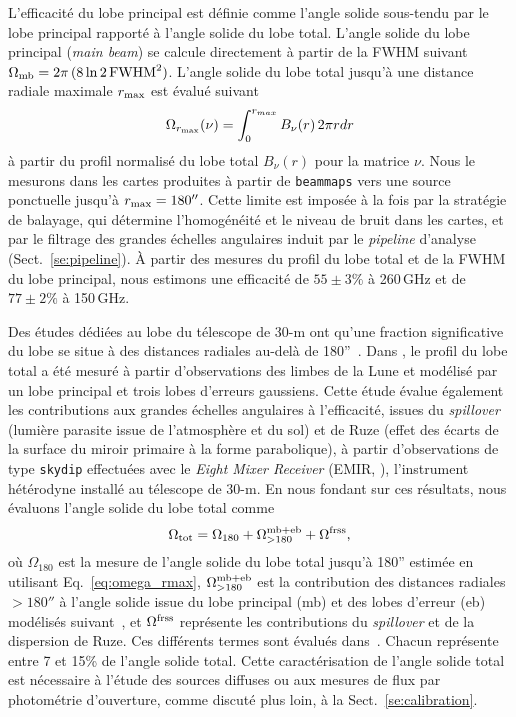L'efficacité du lobe principal est définie comme l'angle solide
sous-tendu par le lobe principal rapporté à l'angle solide du lobe
total. L'angle solide du lobe principal (\emph{main beam}) se calcule
directement à partir de la FWHM suivant $\Omega_{\rm{mb}} = 2\pi\,
(8\ln{2} \, \rm{FWHM}^2)$. L'angle solide du lobe
total jusqu'à une distance radiale maximale $r_{\rm{max}}$ est évalué suivant
\begin{equation}
  \Omega_{r_{\rm{max}}}(\nu) = \int_0^{r_{max}} B_{\nu}(r) \,  2 \pi r dr
  \label{eq:omega_rmax}
\end{equation}
à partir du profil normalisé du lobe total $B_{\nu}(r)$ pour la
matrice $\nu$. Nous le mesurons dans les cartes produites à partir de
{\tt beammaps} vers une source ponctuelle jusqu'à
$r_{\rm{max}}=180''$. Cette limite est imposée à la fois par la
stratégie de balayage, qui détermine l'homogénéité et le niveau de
bruit dans les cartes, et par le filtrage des grandes échelles
angulaires induit par le \emph{pipeline} d'analyse
(Sect.~\ref{se:pipeline}). \`A partir des mesures du profil du lobe
total et de la FWHM du lobe principal, nous estimons une efficacité de
$55 \pm 3\%$ à 260\,GHz et de $77 \pm 2\%$ à 150\,GHz.

Des études dédiées au lobe du télescope de 30-m ont qu'une
fraction significative du lobe se situe à des distances radiales au-delà
de 180''~\citep{Greve1998, Kramer2013}. Dans \citet{Kramer2013}, le
profil du lobe total a été mesuré à partir d'observations des limbes
de la Lune et modélisé par un lobe principal et trois lobes d'erreurs
gaussiens. Cette étude évalue également les contributions aux grandes échelles
angulaires à l'efficacité, issues du \emph{spillover}
(lumière parasite issue de l'atmosphère et du sol) et de Ruze (effet
des écarts de la surface du miroir primaire à la forme parabolique), à
partir d'observations de type {\tt skydip} effectuées avec le
\emph{Eight Mixer Receiver} (EMIR, \citet{Carter2012}),
l'instrument hétérodyne installé au télescope de 30-m. En nous fondant
sur ces résultats, nous évaluons l'angle solide du lobe total comme
\begin{equation}
  \Omega_{\rm{tot}} = \Omega_{180} + \Omega_{>180}^{\rm{mb+eb}} +
  \Omega^{\rm{frss}},
  \label{eq:omega_tot}
\end{equation}
où $\Omega_{180}$ est la mesure de l'angle solide du lobe total
jusqu'à 180'' estimée en utilisant Eq.~\ref{eq:omega_rmax},
$\Omega_{>180}^{\rm{mb+eb}}$ est la contribution des distances
radiales $>180''$ à l'angle solide issue du lobe principal (mb) et des
lobes d'erreur (eb) modélisés suivant~\citet{Kramer2013}, et
$\Omega^{\rm{frss}}$ représente les contributions du \emph{spillover}
et de la dispersion de Ruze. Ces différents termes sont évalués
dans~\citet{Perotto2019}. Chacun représente entre 7 et 15\% de l'angle
solide total. Cette caractérisation de l'angle solide total
est nécessaire à l'étude des sources diffuses ou aux mesures de flux
par photométrie d'ouverture, comme discuté plus loin, à la
Sect.~\ref{se:calibration}.


